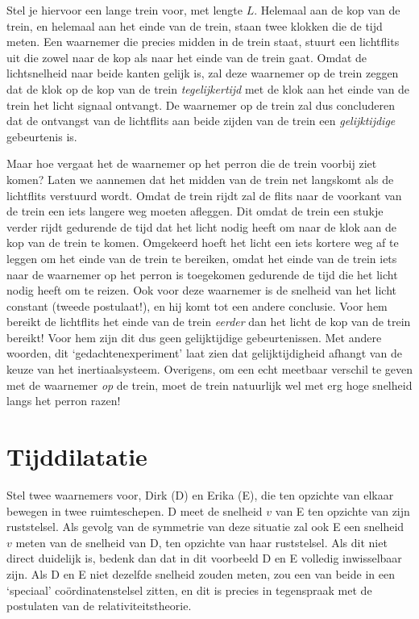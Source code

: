 Stel je hiervoor een lange trein voor, met lengte $L$. Helemaal aan de
kop van de trein, en helemaal aan het einde van de trein, staan twee
klokken die de tijd meten. Een waarnemer die precies midden in de
trein staat, stuurt een lichtflits uit die zowel naar de kop als naar
het einde van de trein gaat. Omdat de lichtsnelheid naar beide kanten
gelijk is, zal deze waarnemer op de trein zeggen dat de klok op de
kop van de trein {\it tegelijkertijd} met de klok aan het einde van de
trein het licht signaal ontvangt. De waarnemer op de trein
zal dus concluderen dat de ontvangst van de lichtflits aan beide zijden van
de trein een {\it gelijktijdige}  gebeurtenis is.

Maar hoe vergaat het de waarnemer op het perron die de trein voorbij
ziet komen? Laten we aannemen dat het midden van de trein net 
langskomt als de lichtflits verstuurd wordt. Omdat de trein rijdt  zal
de flits naar de voorkant van de trein een iets langere
weg moeten afleggen. Dit omdat de trein een stukje verder rijdt gedurende
de tijd dat het licht nodig heeft om naar de klok aan de kop van de
trein te komen. Omgekeerd hoeft het licht een iets kortere weg af te
leggen om het einde van de trein te bereiken, omdat het einde van de
trein iets naar de waarnemer op het perron is toegekomen gedurende de
tijd die het licht nodig heeft om te reizen. Ook voor deze waarnemer
is de snelheid van het licht constant (tweede postulaat!), en hij komt
tot een andere conclusie. Voor hem bereikt de lichtflits het einde
van de trein {\it eerder} dan het licht de kop van de trein bereikt!
Voor hem zijn dit dus geen gelijktijdige gebeurtenissen. Met andere
woorden, dit `gedachtenexperiment' laat zien dat gelijktijdigheid
afhangt van de keuze van het inertiaalsysteem.
Overigens, om een
echt meetbaar verschil te geven met de waarnemer {\it op} de trein,
moet de trein natuurlijk wel met erg hoge snelheid langs het perron razen!

\section{Tijddilatatie} \label{s:lichtklok}
Stel twee waarnemers voor, Dirk (D) en Erika (E), die ten opzichte van
elkaar bewegen in twee ruimteschepen.  D meet de snelheid $v$ van E
ten opzichte van zijn ruststelsel. Als gevolg van de symmetrie van
deze situatie zal ook E een snelheid $v$ meten van de snelheid van D,
ten opzichte van haar ruststelsel. Als dit niet direct duidelijk is, bedenk dan dat 
in dit voorbeeld D en E volledig inwisselbaar zijn. Als D en E  niet dezelfde snelheid zouden meten, zou een van beide in een `speciaal' co\"ordinatenstelsel zitten, en dit is precies in tegenspraak met de postulaten van de relativiteitstheorie.

